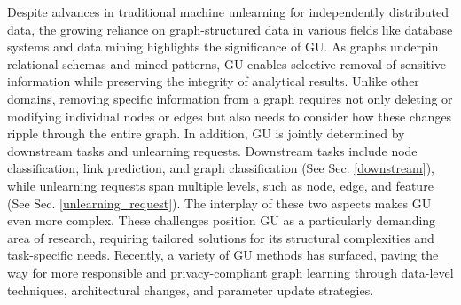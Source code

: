 Despite advances in traditional machine unlearning for independently distributed data, the growing reliance on graph-structured data in various fields like database systems and data mining highlights the significance of GU. As graphs underpin relational schemas and mined patterns, GU enables selective removal of sensitive information while preserving the integrity of analytical results. 
Unlike other domains, removing specific information from a graph requires not only deleting or modifying individual nodes or edges but also needs to consider how these changes ripple through the entire graph. In addition, GU is jointly determined by downstream tasks and unlearning requests. Downstream tasks include node classification, link prediction, and graph classification (See Sec. \ref{downstream}), while unlearning requests span multiple levels, such as node, edge, and feature (See Sec. \ref{unlearning_request}). The interplay of these two aspects makes GU even more complex.
These challenges position GU as a particularly demanding area of research, requiring tailored solutions for its structural complexities and task-specific needs.
Recently, a variety of GU methods has surfaced, paving the way for more responsible and privacy-compliant graph learning through data-level techniques, architectural changes, and parameter update strategies.

